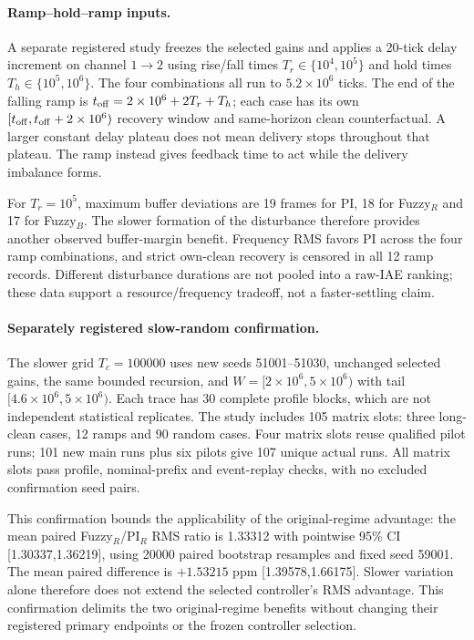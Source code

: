 \paragraph{Ramp--hold--ramp inputs.}
A separate registered study freezes the selected gains and applies
a 20-tick delay increment on channel $1\to2$ using rise/fall times
$T_r\in\{10^4,10^5\}$ and hold times
$T_h\in\{10^5,10^6\}$. The four combinations all run to
$5.2\times10^6$ ticks. The end of the falling ramp is
$t_{\rm off}=2\times10^6+2T_r+T_h$; each case has its own
$[t_{\rm off},t_{\rm off}+2\times10^6)$ recovery window and
same-horizon clean counterfactual. A larger constant delay plateau
does not mean delivery stops throughout that plateau. The ramp
instead gives feedback time to act while the delivery imbalance forms.

For $T_r=10^5$, maximum buffer deviations are 19 frames for PI,
18 for Fuzzy$_R$ and 17 for Fuzzy$_B$. The slower formation of the
disturbance therefore provides another observed buffer-margin
benefit. Frequency RMS favors PI across the four ramp combinations,
and strict own-clean recovery is censored in all 12 ramp records.
Different disturbance durations are not pooled into a raw-IAE ranking;
these data support a resource/frequency tradeoff, not a faster-settling claim.

\paragraph{Separately registered slow-random confirmation.}
The slower grid $T_c=100000$ uses new seeds 51001--51030, unchanged
selected gains, the same bounded recursion, and
$W=[2\times10^6,5\times10^6)$ with tail
$[4.6\times10^6,5\times10^6)$. Each trace has 30 complete
profile blocks, which are not independent statistical replicates.
The study includes 105 matrix slots: three long-clean cases,
12 ramps and 90 random cases. Four matrix slots reuse qualified
pilot runs; 101 new main runs plus six pilots give 107 unique actual
runs. All matrix slots pass profile, nominal-prefix and event-replay
checks, with no excluded confirmation seed pairs.

This confirmation bounds the applicability of the original-regime
advantage: the mean paired Fuzzy$_R$/PI$_R$ RMS ratio is 1.33312
with pointwise 95\% CI [1.30337,1.36219], using 20000 paired
bootstrap resamples and fixed seed 59001. The mean paired difference
is $+1.53215$ ppm [1.39578,1.66175]. Slower variation alone therefore
does not extend the selected controller's RMS advantage. This confirmation
delimits the two original-regime benefits without changing their
registered primary endpoints or the frozen controller selection.

